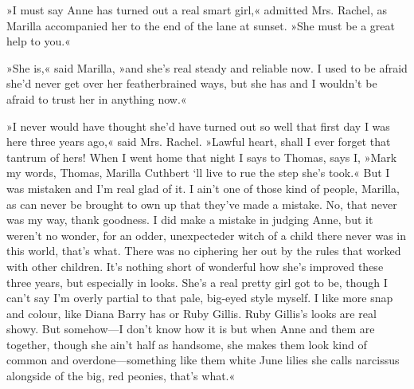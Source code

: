 »I must say Anne has turned out a real smart girl,« admitted Mrs. Rachel, as Marilla accompanied her to the end of the lane at sunset. »She must be a great help to you.«

»She is,« said Marilla, »and she’s real steady and reliable now. I used to be afraid she’d never get over her featherbrained ways, but she has and I wouldn’t be afraid to trust her in anything now.«

»I never would have thought she’d have turned out so well that first day I was here three years ago,« said Mrs. Rachel. »Lawful heart, shall I ever forget that tantrum of hers! When I went home that night I says to Thomas, says I, »Mark my words, Thomas, Marilla Cuthbert `ll live to rue the step she's took.« But I was mistaken and I’m real glad of it. I ain’t one of those kind of people, Marilla, as can never be brought to own up that they’ve made a mistake. No, that never was my way, thank goodness. I did make a mistake in judging Anne, but it weren’t no wonder, for an odder, unexpecteder witch of a child there never was in this world, that’s what. There was no ciphering her out by the rules that worked with other children. It’s nothing short of wonderful how she’s improved these three years, but especially in looks. She’s a real pretty girl got to be, though I can’t say I’m overly partial to that pale, big-eyed style myself. I like more snap and colour, like Diana Barry has or Ruby Gillis. Ruby Gillis’s looks are real showy. But somehow—I don’t know how it is but when Anne and them are together, though she ain’t half as handsome, she makes them look kind of common and overdone—something like them white June lilies she calls narcissus alongside of the big, red peonies, that’s what.«